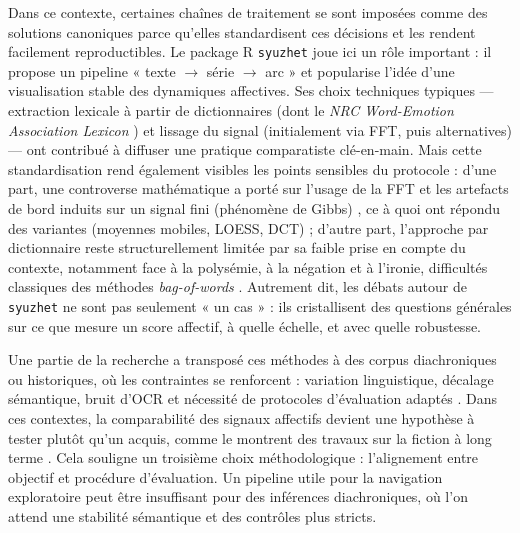 \documentclass[fra, final]{anthology-ch}      %
\begin{document}
Dans ce contexte, certaines chaînes de traitement se sont imposées comme des solutions canoniques parce qu’elles standardisent ces décisions et les rendent facilement reproductibles. Le package R \texttt{syuzhet} \parencite{jockers2015revealing} joue ici un rôle important : il propose un pipeline « texte $\rightarrow$ série $\rightarrow$ arc » et popularise l’idée d’une visualisation stable des dynamiques affectives. Ses choix techniques typiques — extraction lexicale à partir de dictionnaires (dont le \textit{NRC Word-Emotion Association Lexicon} \parencite{mohammad2013}) et lissage du signal (initialement via FFT, puis alternatives) — ont contribué à diffuser une pratique comparatiste clé-en-main. Mais cette standardisation rend également visibles les points sensibles du protocole : d’une part, une controverse mathématique a porté sur l’usage de la FFT et les artefacts de bord induits sur un signal fini (phénomène de Gibbs) \parencite{swafford2015}, ce à quoi ont répondu des variantes (moyennes mobiles, LOESS, DCT) \parencite{jockers2015requiem} ; d’autre part, l’approche par dictionnaire reste structurellement limitée par sa faible prise en compte du contexte, notamment face à la polysémie, à la négation et à l’ironie, difficultés classiques des méthodes \textit{bag-of-words} \parencite{pang2008}. Autrement dit, les débats autour de \texttt{syuzhet} ne sont pas seulement « un cas » : ils cristallisent des questions générales sur ce que mesure un score affectif, à quelle échelle, et avec quelle robustesse.

Une partie de la recherche a transposé ces méthodes à des corpus diachroniques ou historiques, où les contraintes se renforcent : variation linguistique, décalage sémantique, bruit d’OCR et nécessité de protocoles d’évaluation adaptés \parencite{sprugnoli2016historical}. Dans ces contextes, la comparabilité des signaux affectifs devient une hypothèse à tester plutôt qu’un acquis, comme le montrent des travaux sur la fiction à long terme \parencite{morinacerbi2017emotionality}. Cela souligne un troisième choix méthodologique : l’alignement entre objectif et procédure d’évaluation. Un pipeline utile pour la navigation exploratoire peut être insuffisant pour des inférences diachroniques, où l’on attend une stabilité sémantique et des contrôles plus stricts.
\end{document}
